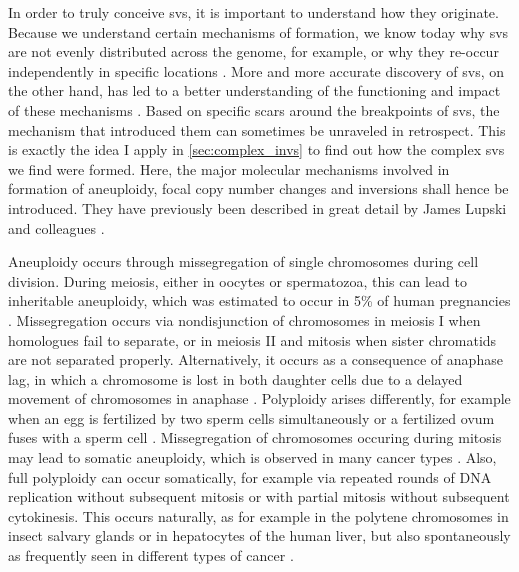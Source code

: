 In order to truly conceive \aclp{sv}, it is important to understand how they
originate. Because we understand certain mechanisms of formation, we know
today why \acp{sv} are not evenly distributed across the genome, for example, or
why they re-occur independently in specific locations \citep{Hastings2009}.
More and more accurate discovery of \acp{sv}, on the other hand, has led to
a better understanding of the functioning and impact of these mechanisms
\citep{Hastings2009,Abyzov2015}. Based on specific scars around the breakpoints
of \acp{sv}, the mechanism that introduced them can sometimes be unraveled in
retrospect. This is exactly the idea I apply in \cref{sec:complex_invs} to find
out how the complex \acp{sv} we find were formed. Here, the major molecular
mechanisms involved in formation of aneuploidy, focal copy number changes and
inversions shall hence be introduced. They have previously been described in
great detail by James Lupski and colleagues \citep{Hastings2009,Carvalho2016}.

Aneuploidy occurs through missegregation of single chromosomes during cell
division. During meiosis, either in oocytes or spermatozoa, this can lead to
inheritable aneuploidy, which was estimated to occur in 5\% of human pregnancies
\citep{Templado2013}. Missegregation occurs via nondisjunction of chromosomes in
meiosis I when homologues fail to separate, or in meiosis II and mitosis when
sister chromatids are not separated properly. Alternatively, it occurs as a
consequence of anaphase lag, in which a chromosome is lost in both daughter
cells due to a delayed movement of chromosomes in anaphase \citep{webAneuploidy}.
Polyploidy arises differently, for example when an egg is fertilized by two
sperm cells simultaneously or a fertilized ovum fuses with a sperm cell
\citep{webAneuploidy}. Missegregation of chromosomes occuring during mitosis may
lead to somatic aneuploidy, which is observed in many cancer types
\citep{Gordon2012}. Also, full polyploidy can occur somatically, for example via
repeated rounds of DNA replication without subsequent mitosis or with partial
mitosis without subsequent cytokinesis. This occurs naturally, as for example
in the polytene chromosomes in insect salvary glands or in hepatocytes of the
human liver, but also spontaneously as frequently seen in different types of
cancer \citep{Davoli2011}.

